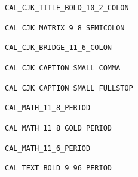 \documentclass[UTF8,a4paper,11pt,openany]{ctexbook}
\begin{document}
\pagestyle{empty}
\noindent\texttt{CAL\_CJK\_TITLE\_BOLD\_10\_2\_COLON}\par\vspace{5pt}
\noindent\texttt{CAL\_CJK\_MATRIX\_9\_8\_SEMICOLON}\par\vspace{5pt}
\noindent\texttt{CAL\_CJK\_BRIDGE\_11\_6\_COLON}\par\vspace{5pt}
\noindent\texttt{CAL\_CJK\_CAPTION\_SMALL\_COMMA}\hspace{36pt}{\small ，}\par\vspace{5pt}
\noindent\texttt{CAL\_CJK\_CAPTION\_SMALL\_FULLSTOP}\hspace{36pt}{\small 。}\par\vspace{5pt}
\noindent\texttt{CAL\_MATH\_11\_8\_PERIOD}\par\vspace{5pt}
\noindent\texttt{CAL\_MATH\_11\_8\_GOLD\_PERIOD}\par\vspace{5pt}
\noindent\texttt{CAL\_MATH\_11\_6\_PERIOD}\par\vspace{5pt}
\noindent\texttt{CAL\_TEXT\_BOLD\_9\_96\_PERIOD}\hspace{36pt}{\small\bfseries 0.3}\par
\end{document}
